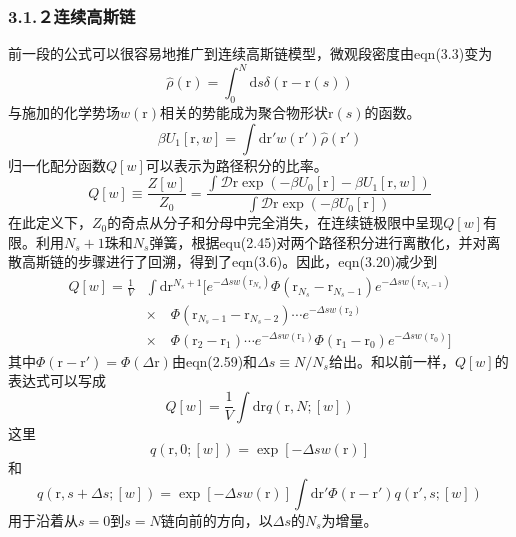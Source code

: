 \subsubsection{3.1.２连续高斯链}
前一段的公式可以很容易地推广到连续高斯链模型，微观段密度由eqn(3.3)变为
\begin{equation}
\hat{\rho}(\mathrm{r})=\int_0^N\mathrm{d}s\delta(\mathrm{r}-\mathrm{r}(s))
\end{equation}
与施加的化学势场$w(\mathrm{r})$相关的势能成为聚合物形状$\mathrm{r}(s)$的函数。
\begin{equation}
\beta U_1[\mathrm{r},w]=\int\mathrm{d}\mathrm{r}'w(\mathrm{r}')\hat{\rho}(\mathrm{r}')
\end{equation}
归一化配分函数$Q[w]$可以表示为路径积分的比率。
\begin{equation}
Q[w]\equiv\frac{Z[w]}{Z_0}=\frac{\int\mathcal{D}\mathrm{r}\exp(-\beta U_0[\mathrm{r}]-\beta U_1[\mathrm{r},w])}{\int\mathcal{D}\mathrm{r}\exp(-\beta U_0[\mathrm{r}])}
\end{equation}
在此定义下，$Z_0$的奇点从分子和分母中完全消失，在连续链极限中呈现$Q[w]$有限。利用$N_s+1$珠和$N_s$弹簧，根据equ(2.45)对两个路径积分进行离散化，并对离散高斯链的步骤进行了回溯，得到了eqn(3.6)。因此，eqn(3.20)减少到
\begin{equation}
\begin{aligned}
Q[w]=\frac{1}{V}&\int\mathrm{d}\mathrm{r}^{N_s+1}[e^{-\Delta sw(\mathrm{r}_{N_s})}\Phi(\mathrm{r}_{N_s}-\mathrm{r}_{N_s-1})e^{-\Delta sw(\mathrm{r}_{N_s-1})}\\
&\times\quad\Phi(\mathrm{r}_{N_s-1}-\mathrm{r}_{N_s-2})\cdots e^{-\Delta sw(\mathrm{r}_2)}\\
&\times\quad\Phi(\mathrm{r}_2-\mathrm{r}_1)\cdots e^{-\Delta sw(\mathrm{r}_1)}\Phi(\mathrm{r}_1-\mathrm{r}_0)e^{-\Delta sw(\mathrm{r}_0)}]
\end{aligned}
\end{equation}
其中$\Phi(\mathrm{r}-\mathrm{r}')=\Phi(\Delta\mathrm{r})$由eqn(2.59)和$\Delta s\equiv N/N_s$给出。和以前一样，$Q[w]$的表达式可以写成
\begin{equation}
Q[w]=\frac{1}{V}\int\mathrm{d}\mathrm{r}q(\mathrm{r},N;[w])
\end{equation}
这里
\begin{equation}
q(\mathrm{r},0;[w])=\exp[-\Delta sw(\mathrm{r})]
\end{equation}
和
\begin{equation}
q(\mathrm{r},s+\Delta s;[w])=\exp[-\Delta sw(\mathrm{r})]\int\mathrm{d}\mathrm{r}'\Phi(\mathrm{r}-\mathrm{r}')q(\mathrm{r}',s;[w])
\end{equation}
用于沿着从$s=0$到$s=N$链向前的方向，以$\Delta s$的$N_s$为增量。

